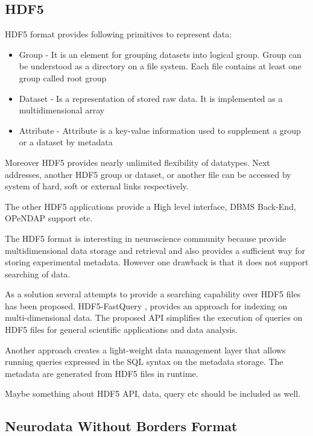 \documentclass[utf8]{frontiersSCNS} %
\begin{document}
\subsection{HDF5}

HDF5 format \citep{Koziol2011} provides following primitives to represent data:

\begin{itemize}
 \item Group - It is an element for grouping datasets into logical group. Group can be understood as a directory on a file system. Each file contains at least one group called root group
 \item Dataset - Is a representation of stored raw data. It is implemented as a multidimensional array 
 \item Attribute - Attribute is a key-value information used to supplement a group or a dataset by metadata
\end{itemize}

Moreover HDF5 provides nearly unlimited flexibility of datatypes. Next addresses, another HDF5 group or dataset, or another file can be accessed by system of hard, soft or external links respectively.

The other HDF5 applications \citep{Folk:2011:OHT:1966895.1966900} provide a High level interface, DBMS Back-End, OPeNDAP support etc.

The HDF5 format is interesting in neuroscience community because provide multidimensional data storage and retrieval and also provides a sufficient way for storing experimental metadata. However one drawback is that it does not support searching of data.



As a solution several attempts to provide a searching capability over HDF5 files has been proposed. HDF5-FastQuery \citep{1644309}, \citep{6114446} provides an approach for indexing on multi-dimensional data. The proposed API simplifies the execution of queries on HDF5 files for general scientific applications and data analysis.

Another approach \citep{6546110} creates a light-weight data management layer that allows running queries expressed in the SQL syntax on the metadata storage. The metadata are generated from HDF5 files in runtime.

Maybe something about HDF5 API, data, query etc should be included as well.


\subsection{Neurodata Without Borders Format}
\end{document}
